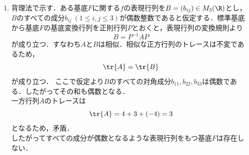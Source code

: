 \begin{souanswer}
\begin{enumerate}
  \item 背理法で示す．ある基底$F$に関する$f$の表現行列を$B= (b_{ij})\in M_3(\R)$とし，$B$のすべての成分$b_{ij}\ (1\le i, j\le 3)$が偶数整数であると仮定する．標準基底から基底$F$の基底変換行列を正則行列$P$とおくと，表現行列の変換規則より
\begin{equation*}
  B= P^{-1}AP
\end{equation*}
  が成り立つ．すなわち$A$と$B$は相似．相似な正方行列のトレースは不変であるため，
\begin{equation*}
  \tr{A}= \tr{B}
\end{equation*}
  が成り立つ．
  ここで仮定より$B$のすべての対角成分$b_{11}, b_{22}, b_{33}$は偶数である．したがってその和も偶数となる．\\
  一方行列$A$のトレースは
\begin{equation*}
  \tr{A}= 4+ 3+ (-4)= 3
\end{equation*}
  となるため，矛盾．\\
  したがってすべての成分が偶数となるような表現行列をもつ基底$F$は存在しない．
\end{enumerate}
\end{souanswer}
